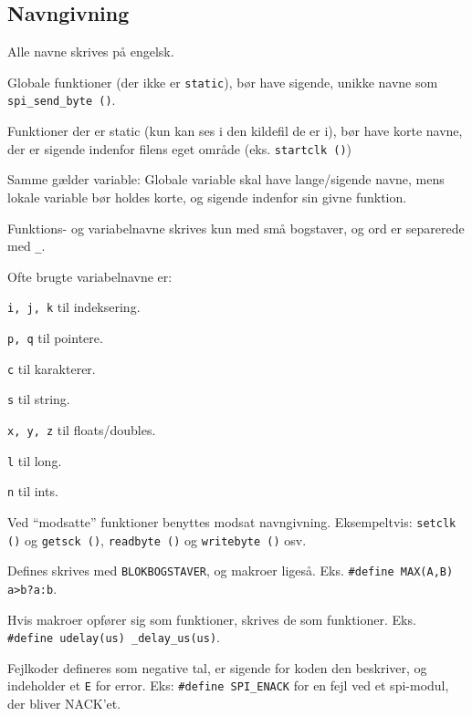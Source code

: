 \documentclass[article, 10pt]{memoir}
\let\tempone\itemize
\let\temptwo\enditemize
\renewenvironment{itemize}{\tempone\firmlist}{\temptwo}
\begin{document}
\begin{multicols}{2}
    \chapter{Navngivning}
    \begin{itemize}
        \item Alle navne skrives på engelsk.
        \item Globale funktioner (der ikke er \texttt{static}), bør have sigende, unikke navne som \texttt{spi\_send\_byte ()}.
        \item Funktioner der er static (kun kan ses i den kildefil de er i), bør have korte navne, der er sigende indenfor filens eget område (eks. \texttt{startclk ()})
        \item Samme gælder variable: Globale variable skal have lange/sigende navne, mens lokale variable bør holdes korte, og sigende indenfor sin givne funktion.
        \item Funktions- og variabelnavne skrives kun med små bogstaver, og ord er separerede med \texttt{\_}.
        \item Ofte brugte variabelnavne er:
            \begin{itemize}
                \item \texttt{i, j, k} til indeksering.
                \item \texttt{p, q} til pointere.
                \item \texttt{c} til karakterer.
                \item \texttt{s} til string.
                \item \texttt{x, y, z} til floats/doubles.
                \item \texttt{l} til long.
                \item \texttt{n} til ints.
            \end{itemize}
        \item Ved ``modsatte'' funktioner benyttes modsat navngivning. Eksempeltvis: \texttt{setclk ()} og \texttt{getsck ()}, \texttt{readbyte ()} og \texttt{writebyte ()} osv.
        \item Defines skrives med \texttt{BLOKBOGSTAVER}, og makroer ligeså. Eks. \texttt{\#define MAX(A,B) a>b?a:b}. 
            
            Hvis makroer opfører sig som funktioner, skrives de som funktioner. Eks. \texttt{\#define\ udelay(us) \_delay\_us(us)}.
        \item Fejlkoder defineres som negative tal, er sigende for koden den beskriver, og indeholder et \texttt{E} for error. Eks: \texttt{\#define SPI\_ENACK} for en fejl ved et spi-modul, der bliver NACK’et.
    \end{itemize}


\end{multicols}
\end{document}
